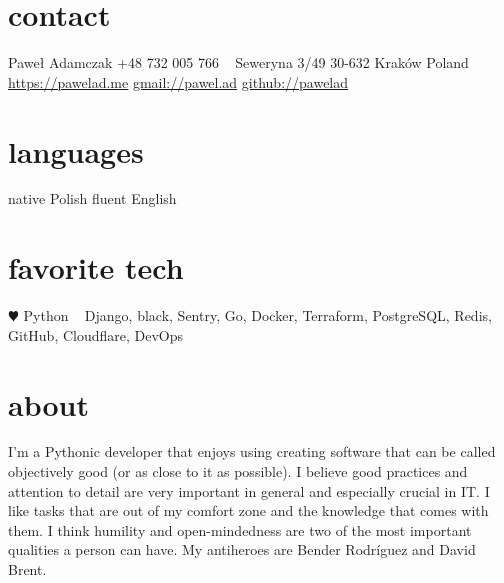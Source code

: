 \documentclass[]{cv-style}  %
\begin{document}
\lastupdated


\begin{aside}
%
\section{contact}
Paweł Adamczak
+48 732 005 766
~
Seweryna 3/49
30-632 Kraków
Poland
~
\href{https://pawelad.me/}{https://pawelad.me}
\href{mailto:pawel.ad@gmail.com}{gmail://pawel.ad}
\href{https://www.github.com/pawelad}{github://pawelad}
%
\section{languages}
native Polish
fluent English
%
\section{favorite tech}
{\color{red} $\varheartsuit$} Python
~
Django, black, Sentry, Go, Docker, Terraform, PostgreSQL, Redis, GitHub, Cloudflare, DevOps
\end{aside}


\section{about}
  \vspace{-0.3cm}

I'm a Pythonic developer that enjoys using  creating software that can be called objectively good (or as close to it as possible). I believe good practices and attention to detail are very important in general and especially crucial in IT. I like tasks that are out of my comfort zone and the knowledge that comes with them. I think humility and open-mindedness are two of the most important qualities a person can have. My antiheroes are Bender Rodríguez and David Brent.

\end{document}
